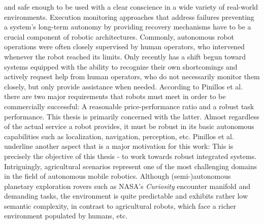 \documentclass[english, master, utf8]{base/thesis_KBS}
\begin{document}
and safe enough to be used with a clear conscience in a wide variety of real-world environments. \cite{Arvin:2018} Execution monitoring approaches that address failures preventing
a system's long-term autonomy by providing recovery mechanisms have to be a crucial component of robotic architectures. \cite{Kunze:2018}
Commonly, autonomous robot operations were often closely supervised by human operators, who intervened whenever the robot reached its limits. \cite{Rosenthal:2011}
Only recently has a shift begun toward systems equipped with the ability to recognize their own shortcomings and actively request help from human operators, who do not
necessarily monitor them closely, but only provide assistance when needed. \cite{Rosenthal:2011} According to Pinillos et al. there are two major requirements that robots must meet
in order to be commercially successful: A reasonable price-performance ratio and a robust task performance. \cite{Pinillos:2016} This thesis is primarily concerned with the latter.
Almost regardless of the actual service a robot provides, it must be robust in its basic autonomous capabilities such as localization, navigation, perception, etc. Pinillos et al.
underline another aspect that is a major motivation for this work:  \cite{Pinillos:2016} This is precisely the objective of this thesis - to work towards robust
integrated systems. Intriguingly, agricultural scenarios represent one of the most challenging domains in the field of autonomous mobile robotics. Although (semi-)autonomous
planetary exploration rovers such as NASA's \textit{Curiosity} encounter manifold and demanding tasks, the environment is quite predictable and exhibits
rather low semantic complexity, in contrast to agricultural robots, which face a richer environment populated by humans, etc. \cite{Ingrand:2017}\newline
\end{document}
